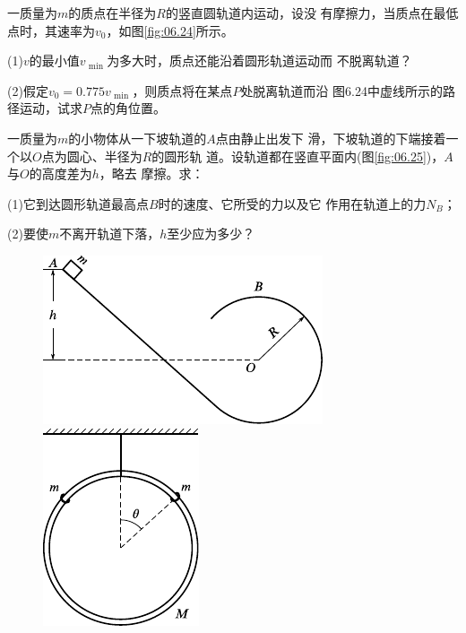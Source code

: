 \begin{exercises}
\exercise 一质量为$ m $的质点在半径为$ R $的竖直圆轨道内运动，设没
有摩擦力，当质点在最低点时，其速率为$ v_ 0 $，如图\ref{fig:06.24}\;所示。

(1)\;$ v $的最小值$ v _ { \text { min } } $为多大时，质点还能沿着圆形轨道运动而
不脱离轨道？

(2)假定$ v _ { 0 } = 0.775 v _ { \text { min } } $，则质点将在某点$ P $处脱离轨道而沿
图6.24中虚线所示的路径运动，试求$ P $点的角位置。

\exercise 一质量为$ m $的小物体从一下坡轨道的$ A $点由静止出发下
滑，下坡轨道的下端接着一个以$ O $点为圆心、半径为$ R $的圆形轨
道。设轨道都在竖直平面内(图\ref{fig:06.25})，$ A $与$ O $的高度差为$ h $，略去
摩擦。求：

(1)它到达圆形轨道最高点$ B $时的速度、它所受的力以及它
作用在轨道上的力$ N _ { B } $；

(2)要使$ m $不离开轨道下落，$ h $至少应为多少？

\begin{figure}[h]
  \begin{minipage}[b]{0.63\linewidth}
    \centering
    \includegraphics{figure/fig06.25}
    \caption{}
    \label{fig:06.25}
  \end{minipage}
  \begin{minipage}[b]{0.35\linewidth}
    \centering
    \includegraphics{figure/fig06.26}
    \caption{}
    \label{fig:06.26}
  \end{minipage}
\vspace{-0.8em}
\end{figure}



\end{exercises}
